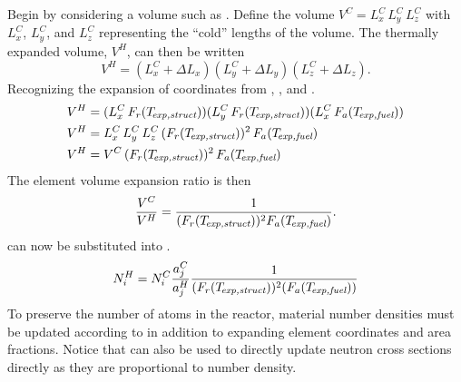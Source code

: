     Begin by considering a volume such as . Define the
    volume $V^C = L_x^C \, L_y^C \, L_z^C$ with $L_x^C$, $L_y^C$, and $L_z^C$
    representing the ``cold'' lengths of the volume. The thermally expanded
    volume, $V^H$, can then be written
    \begin{equation}
      V^H = (L_x^C + \Delta L_x) (L_y^C + \Delta L_y) (L_z^C + \Delta L_z).
    \end{equation}
    Recognizing the expansion of coordinates from ,
    , and .
    \begin{align}
      V^H &= (L_x^C \, F_r(T_{\!\mbox{\scriptsize \em exp,struct}})) (L_y^C \, F_r(T_{\!\mbox{\scriptsize \em exp,struct}})) 
        (L_x^C \, F_a({T_{\!\mbox{\scriptsize \em exp,fuel}}})) \\
      V^H &= L_x^C \, L_y^C \, L_z^C \,(F_r(T_{\!\mbox{\scriptsize \em exp,struct}}))^2 \,
        F_a({T_{\!\mbox{\scriptsize \em exp,fuel}}}) \\
      V^H &= V^C \, (F_r(T_{\!\mbox{\scriptsize \em exp,struct}}))^2 \, F_a({T_{\!\mbox{\scriptsize \em exp,fuel}}}) 
    \end{align}
    The element volume expansion ratio is then
    \begin{equation}
      \label{eq:volume_ratio}
      \frac{V^C}{V^H} = \frac{1}{(F_r(T_{\!\mbox{\scriptsize \em exp,struct}}))^2 F_a({T_{\!\mbox{\scriptsize \em exp,fuel}}})}.
    \end{equation}
     can now be substituted into
    .
    \begin{equation}
      \label{eq:nden_thexp_update}
      N_i^H = N_i^C \frac{a_j^C}{a_j^H} 
        \frac{1}{(F_r(T_{\!\mbox{\scriptsize \em exp,struct}}))^2 (F_a({T_{\!\mbox{\scriptsize \em exp,fuel}}}))}
    \end{equation}
    To preserve the number of atoms in the reactor, material number densities
    must be updated according to  in addition to
    expanding element coordinates and area fractions. Notice that
     can also be used to directly update neutron
    cross sections directly as they are proportional to number density.
    
